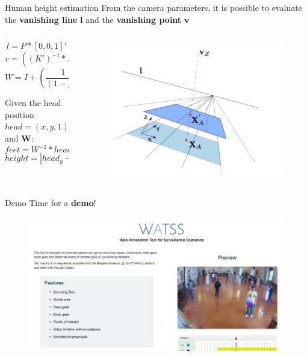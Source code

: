 \documentclass{beamer}
\begin{document}
\begin{tframe}{Human height estimation}
From the camera parameters, it is possible to evaluate the \textbf{vanishing line} $\textbf{l}$ and the \textbf{vanishing point} $\textbf{v}$


\begin{columns}[t] %
\begin{column}{.45\textwidth}
$$l = P * [0, 0, 1]'$$
$$v = ((K')^{-1} * K^{-1}) * l$$
$$W = I + (\frac{1}{(1 - \mu)} - 1) * \frac{v * l'}{v' * l}$$

\vspace{0.2cm}
Given the head position $head = (x, y, 1)$ and $\textbf{W}$:
$$feet = W^{-1} * head$$
$$height = |head_y - feet_y|$$

\end{column}%
\begin{column}{.5\textwidth}
\begin{figure}[h]
\centering
\includegraphics[width=1.1\textwidth]{images/height_calib.jpg}
\end{figure}
\end{column}%
\end{columns}


\end{tframe}


\begin{tframe}{Demo}
Time for a \textbf{demo}!
\begin{figure}[h]
\centering
\includegraphics[width=1\textwidth]{images/demo.jpg}
\end{figure}
\end{tframe}
\end{document}
